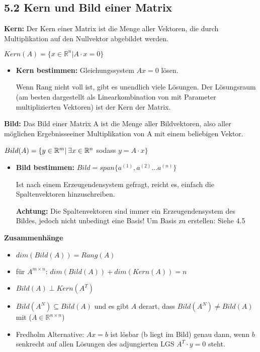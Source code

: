 \subsection{5.2 Kern und Bild einer Matrix}{
\vskip1pt
\textbf{Kern:}
Der Kern einer Matrix ist die Menge aller Vektoren, die durch Multiplikation auf den Nullvektor abgebildet werden.
\vskip3pt
\begin{center}
$Kern(A) = \{x \in \mathbb{R}^n | A\cdot x = 0 \}$
\end{center}

\begin{itemize}[leftmargin=0.29cm, itemsep=0.5pt]
\item \textbf{Kern bestimmen:} Gleichungssystem $Ax = 0$ lösen. \par Wenn Rang nicht voll ist, gibt es unendlich viele Lösungen. Der Lösungsraum (am besten dargestellt als Linearkombination von mit Parameter multiplizierten Vektoren) ist der Kern der Matrix.
\end{itemize}

\vskip2pt

\textbf{Bild:}
Das Bild einer Matrix A ist die Menge aller Bildvektoren, also aller möglichen \glqq Ergebnisse\grqq einer Multiplikation von A mit einem beliebigen Vektor.

\vskip3pt
\begin{center}
$Bild(A) = \{y \in \mathbb{R}^m | \hskip2pt \exists x \in \mathbb{R}^n$ sodass $y = A\cdot x \}$
\end{center}
\vspace{-5pt}

\begin{itemize}[leftmargin=0.29cm, itemsep=0.5pt]
\item \textbf{Bild bestimmen:} $Bild = span\{a^{(1)}, a^{(2)} \hdots a^{(n)}\}$ \par
Ist nach einem Erzeugendensystem gefragt, reicht es, einfach die Spaltenvektoren hinzuschreiben. \par
\textbf{Achtung:} Die Spaltenvektoren sind immer ein Erzeugendensystem des Bildes, jedoch nicht unbedingt eine Basis! Um Basis zu erstellen: Siehe 4.5
\end{itemize}

\vspace{0pt}

\textbf{Zusammenhänge}
\begin{itemize}[leftmargin=0.29cm, itemsep=0.5pt]
\item $dim(Bild(A)) = Rang(A)$
\item für $A^{m \times n}$: $dim(Bild(A)) + dim(Kern(A)) = n$
\item $Bild(A) \perp Kern(A^T)$
\item $Bild(A^N) \subseteq Bild(A)$ und es gibt $A$ derart, dass $Bild(A^N) \neq Bild(A)$ mit ($A \in \mathbb{R}^{n \times n}$)
\item Fredholm Alternative: $Ax = b$ ist lösbar (b liegt im Bild) genau dann, wenn $b$ senkrecht auf allen
Lösungen des adjungierten LGS $A^T \cdot y = 0$ steht.
\end{itemize}

}
\WhiteSpace
